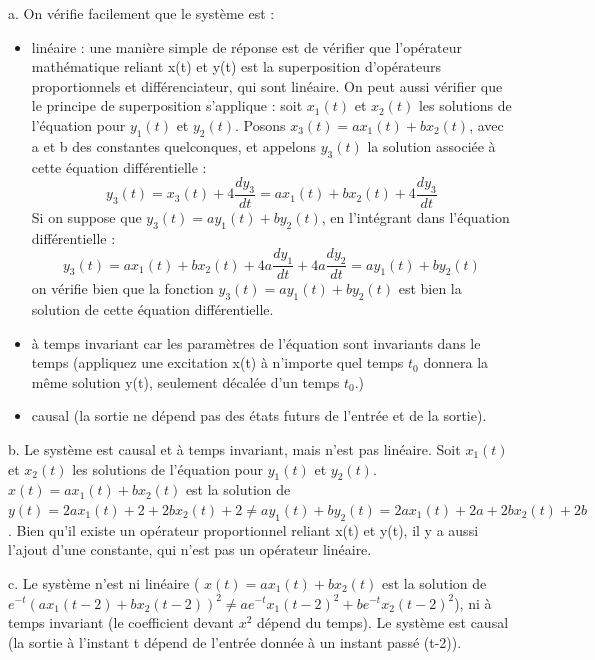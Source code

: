 \documentclass[11pt]{report}
\begin{document}
	a. On vérifie facilement que le système est :
	 \begin{itemize}
	 	\item linéaire : une manière simple de réponse est de vérifier que l'opérateur mathématique reliant x(t) et y(t) est la superposition d'opérateurs proportionnels et différenciateur, qui sont linéaire. On peut aussi vérifier que le principe de superposition s'applique : soit $x_{1}(t) $ et $x_{2}(t)$ les solutions de l'équation pour $y_{1}(t)$ et $y_{2}(t)$. Posons $x_3(t)=ax_{1}(t)+bx_{2}(t)$, avec a et b des constantes quelconques, et appelons $y_3(t)$ la solution associée à cette équation différentielle :
	 	\begin{equation*}
	 	y_3(t)=x_3(t)+4\frac{dy_3}{dt}=ax_{1}(t)+bx_{2}(t)+4\frac{dy_3}{dt}
	 	\end{equation*}
	 	Si on suppose que $y_3(t)=ay_{1}(t)+by_{2}(t)$, en l'intégrant dans l'équation différentielle :
	 	\begin{equation*}
	 	y_3(t)=ax_{1}(t)+bx_{2}(t)+4a\frac{dy_1}{dt}+4a\frac{dy_2}{dt}=ay_1(t)+by_2(t)
	 	\end{equation*}
	 	on vérifie bien que la fonction $y_3(t)=ay_1(t)+by_2(t)$ est bien la solution de cette équation différentielle.
	 	\item à temps invariant car les paramètres de l'équation sont invariants dans le temps (appliquez une excitation x(t) à n'importe quel temps $t_0$ donnera la même solution y(t), seulement décalée d'un temps $t_0$.)
	 	\item causal (la sortie ne dépend pas des états futurs de l'entrée et de la sortie).
	 \end{itemize}
 	\vspace{0.5\baselineskip}
 	b. Le système est causal et à temps invariant, mais n'est pas linéaire. Soit  $x_{1}(t) $ et $x_{2}(t)$ les solutions de l'équation pour $y_{1}(t)$ et $y_{2}(t)$. $x(t)= ax_{1}(t)+bx_{2}(t)$ est la solution de $y(t)=2ax_{1}(t)+2+2bx_{2}(t)+2 \neq ay_{1}(t)+by_{2}(t)=2ax_{1}(t)+2a+2bx_{2}(t)+2b$. Bien qu'il existe un opérateur proportionnel reliant x(t) et y(t), il y a aussi l'ajout d'une constante, qui n'est pas un opérateur linéaire.
 	
 	\vspace{0.5\baselineskip}
 	c. Le système n'est ni linéaire ( $x(t)= ax_{1}(t)+bx_{2}(t)$ est la solution de $e^{-t}(ax_{1}(t-2)+bx_{2}(t-2))^{2} \neq ae^{-t}x_{1}(t-2)^{2}+be^{-t}x_{2}(t-2)^{2}$), ni à temps invariant (le coefficient devant $x^{2}$ dépend du temps). Le système est causal (la sortie à l'instant t dépend de l'entrée donnée à un instant passé (t-2)).
 	
\end{document}
